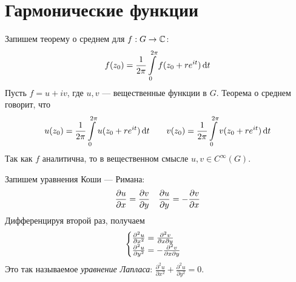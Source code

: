 \documentclass[a4paper]{report}
\begin{document}
    \section{Гармонические функции}
    Запишем теорему о среднем для $f: G \rightarrow \mathbb{C}$:
    \[f(z_0) = \frac 1{2\pi} \int\limits_{0}^{2\pi}f(z_0 + r e^{it})\operatorname{d}\! t\]
    Пусть $f = u + iv$, где $u, v$ --- вещественные функции в $G$.
    Теорема о среднем говорит, что
    \[u(z_0) = \frac 1{2\pi} \int\limits_{0}^{2\pi}u(z_0 + r e^{it})\operatorname{d}\! t \qquad v(z_0) = \frac 1{2\pi}\int\limits_{0}^{2\pi}v(z_0 + r e^{it})\operatorname{d}\! t\]
    Так как $f$ аналитична, то в вещественном смысле $u, v \in C^{\infty}(G)$.

    Запишем уравнения Коши --- Римана:
    \[\frac{\partial u}{\partial x} = \frac{\partial v}{\partial y} \quad \frac{\partial u}{\partial y} = -\frac{\partial v}{\partial x}\]
    Дифференцируя второй раз, получаем \[\begin{cases}\frac{\partial^2 u}{\partial x^2} = \frac{\partial^2 v}{\partial x \partial y} \\ \frac{\partial^2 u}{\partial y^2} = -\frac{\partial^2 v}{\partial x \partial y}\end{cases}\]
    Это так называемое \emph{уравнение Лапласа}: $\frac{\partial^2 u}{\partial x^2} + \frac{\partial^2 u}{\partial y^2} = 0$.
\end{document}
